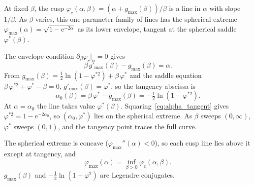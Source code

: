 \documentclass[letterpaper]{article} %
\newcommand{\e}{{\mathrm{e}}}
\newcommand{\Bnet}{\beta}
\begin{document}
At fixed $\Bnet$, the cusp $\varphi_c(\alpha, \Bnet) = (\alpha + g_{\max}(\Bnet))/\Bnet$
is a line in $\alpha$ with slope $1/\Bnet$. As $\Bnet$ varies, this one-parameter
family of lines has the spherical extreme
$\varphi_{\max}(\alpha) = \sqrt{1-\e^{-2\alpha}}$ as its lower envelope, tangent at
the spherical saddle $\varphi^*(\Bnet)$.

The envelope condition $\partial_\Bnet \varphi_c|_\alpha = 0$ gives
\begin{equation}
\Bnet\, g'_{\max}(\Bnet) - g_{\max}(\Bnet) = \alpha.
\end{equation}
From $g_{\max}(\Bnet) = \tfrac12 \ln(1-\varphi^{*2}) + \Bnet\,\varphi^*$ and the
saddle equation $\Bnet\,\varphi^{*2} + \varphi^* - \Bnet = 0$, $g'_{\max}(\Bnet) = \varphi^*$,
so the tangency abscissa is
\begin{equation}
\alpha_0(\Bnet) = \Bnet\,\varphi^* - g_{\max}(\Bnet) = -\tfrac12 \ln(1-\varphi^{*2}).
\label{eq:alpha_tangent}
\end{equation}
At $\alpha = \alpha_0$ the line takes value $\varphi^*(\Bnet)$.
Squaring~\eqref{eq:alpha_tangent} gives $\varphi^{*2} = 1 - \e^{-2\alpha_0}$, so
$(\alpha_0, \varphi^*)$ lies on the spherical extreme. As $\Bnet$ sweeps
$(0, \infty)$, $\varphi^*$ sweeps $(0, 1)$, and the tangency point traces the full
curve.

The spherical extreme is concave ($\varphi_{\max}''(\alpha) < 0$), so each cusp
line lies above it except at tangency, and
\begin{equation}
\varphi_{\max}(\alpha) = \inf_{\Bnet > 0} \varphi_c(\alpha, \Bnet).
\end{equation}
$g_{\max}(\Bnet)$ and $-\tfrac12 \ln(1-\varphi^2)$ are Legendre conjugates.
\end{document}
